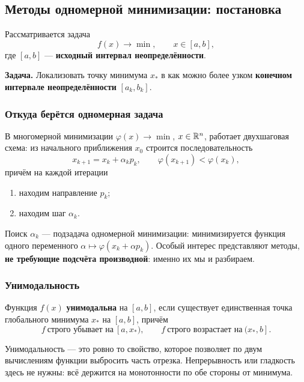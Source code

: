 
\subsection{Методы одномерной минимизации: постановка}

Рассматривается задача
\[
  f(x) \longrightarrow \min, \qquad x \in [a,b] ,
\]
где $[a,b]$ — \textbf{исходный интервал неопределённости}.

\medskip
\noindent\textbf{Задача.} Локализовать точку минимума $x_*$ в как можно более
узком \textbf{конечном интервале неопределённости} $[a_k, b_k]$.

\subsubsection*{Откуда берётся одномерная задача}

В многомерной минимизации $\varphi(x) \to \min$, $x \in \mathbb{R}^n$, работает
двухшаговая схема: из начального приближения $x_0$ строится
последовательность
\[
  x_{k+1} = x_k + \alpha_k p_k , \qquad \varphi(x_{k+1}) < \varphi(x_k) ,
\]
причём на каждой итерации
\begin{enumerate}[label=\arabic*), leftmargin=2em]
  \item находим направление $p_k$;
  \item находим шаг $\alpha_k$.
\end{enumerate}


Поиск $\alpha_k$ — подзадача одномерной минимизации: минимизируется функция
одного переменного $\alpha \mapsto \varphi(x_k + \alpha p_k)$. Особый интерес
представляют методы, \textbf{не требующие подсчёта производной}: именно их мы и
разбираем.

\subsubsection*{Унимодальность}

\begin{definition}
Функция $f(x)$ \textbf{унимодальна} на $[a,b]$, если существует единственная
точка глобального минимума $x_*$ на $[a,b]$, причём
\[
  f \ \text{строго убывает на} \ [a, x_*) ,
  \qquad
  f \ \text{строго возрастает на} \ (x_*, b] .
\]
\end{definition}

\begin{idea}
Унимодальность — это ровно то свойство, которое позволяет по двум вычислениям
функции выбросить часть отрезка. Непрерывность или гладкость здесь не нужны:
всё держится на монотонности по обе стороны от минимума.
\end{idea}

